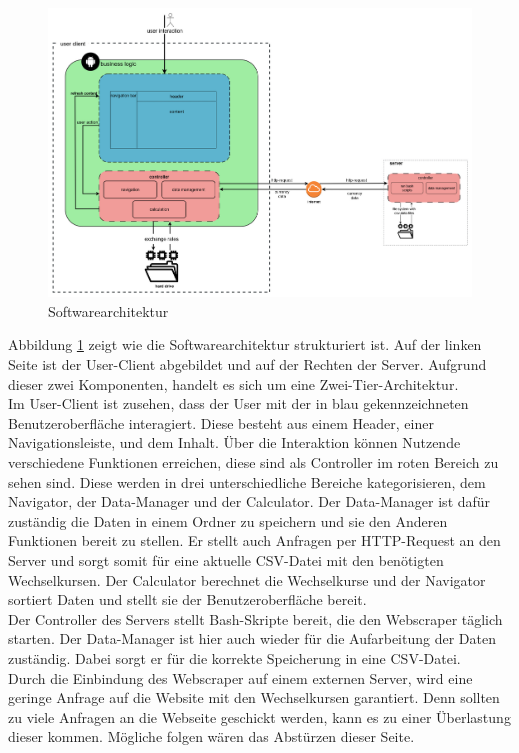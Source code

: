 \documentclass[conference]{IEEEtran}
\begin{document}
\begin{figure}[h]
	\centering
	\includegraphics[width=1\linewidth, frame]{Software-Architektur_SWEII}
	\caption[Softwarearchitektur]{Softwarearchitektur}
	\label{fig:software-architektursweii}
\end{figure}
\noindent
Abbildung \ref{fig:software-architektursweii} zeigt wie die Softwarearchitektur strukturiert ist. Auf der linken Seite ist der User-Client abgebildet und auf der Rechten der Server. Aufgrund dieser zwei Komponenten, handelt es sich um eine Zwei-Tier-Architektur. \\
Im User-Client ist zusehen, dass der User mit der in blau gekennzeichneten Benutzeroberfläche interagiert. Diese besteht aus einem Header, einer Navigationsleiste, und dem Inhalt. Über die Interaktion können Nutzende verschiedene Funktionen erreichen, diese sind als Controller im roten Bereich zu sehen sind. Diese werden in drei unterschiedliche Bereiche kategorisieren, dem Navigator, der Data-Manager und der Calculator. Der Data-Manager ist dafür zuständig die Daten in einem Ordner zu speichern und sie den Anderen Funktionen bereit zu stellen. Er stellt auch Anfragen per HTTP-Request an den Server und sorgt somit für eine aktuelle CSV-Datei mit den benötigten Wechselkursen. Der Calculator berechnet die Wechselkurse und der Navigator sortiert Daten und stellt sie der Benutzeroberfläche bereit. \\
 Der Controller des Servers stellt Bash-Skripte bereit, die den Webscraper täglich starten. Der Data-Manager ist hier auch wieder für die Aufarbeitung der Daten zuständig. Dabei sorgt er für die korrekte Speicherung in eine CSV-Datei.\\
Durch die Einbindung des Webscraper auf einem externen Server, wird eine geringe Anfrage auf die Website mit den Wechselkursen garantiert. Denn sollten zu viele Anfragen an die Webseite geschickt werden, kann es zu einer Überlastung dieser kommen. Mögliche folgen wären das Abstürzen dieser Seite.
\end{document}
